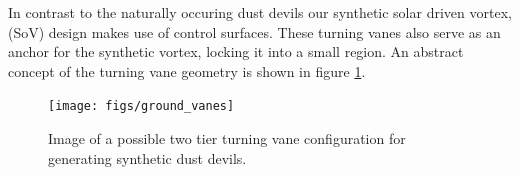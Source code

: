 In contrast to the naturally occuring dust devils
our synthetic solar driven vortex, (SoV) design makes use of
control surfaces. These turning vanes also serve as an anchor for the
synthetic vortex, locking it into a small region. An abstract concept of
the turning vane geometry is shown in figure \ref{fig:cartoon_vanes}.

  \begin{figure}[!htb]
    \begin{center}
     \texttt{[image: figs/ground\_vanes]}
     \caption{Image of a possible two tier turning vane 
       configuration for generating synthetic dust devils.}
     \label{fig:cartoon_vanes}
    \end{center}
  \end{figure}




